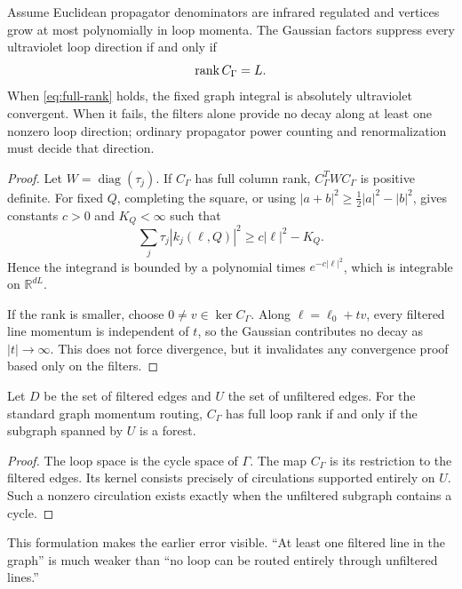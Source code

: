 \documentclass[11pt]{article}
\newcommand{\RR}{\mathbb{R}}
\begin{document}
\begin{theorem}
\label{thm:rank}
Assume Euclidean propagator denominators are infrared regulated and vertices
grow at most polynomially in loop momenta. The Gaussian factors suppress
every ultraviolet loop direction if and only if
\begin{equation}
 \operatorname{rank} C_\Gamma=L.
 \label{eq:full-rank}
\end{equation}
When \eqref{eq:full-rank} holds, the fixed graph integral is absolutely
ultraviolet convergent. When it fails, the filters alone provide no decay
along at least one nonzero loop direction; ordinary propagator power counting
and renormalization must decide that direction.
\end{theorem}

\begin{proof}
Let \(W=\operatorname{diag}(\tau_j)\). If \(C_\Gamma\) has full column rank,
\(C_\Gamma^{T}WC_\Gamma\) is positive definite. For fixed \(Q\), completing
the square, or using
\(|a+b|^2\geq\tfrac12|a|^2-|b|^2\), gives constants \(c>0\) and \(K_Q<\infty\)
such that
\[
 \sum_j\tau_j|k_j(\ell,Q)|^2
 \geq c|\ell|^2-K_Q.
\]
Hence the integrand is bounded by a polynomial times \(e^{-c|\ell|^2}\),
which is integrable on \(\RR^{dL}\).

If the rank is smaller, choose \(0\neq v\in\ker C_\Gamma\). Along
\(\ell=\ell_0+tv\), every filtered line momentum is independent of \(t\), so
the Gaussian contributes no decay as \(|t|\to\infty\). This does not force
divergence, but it invalidates any convergence proof based only on the
filters.
\end{proof}

\begin{corollary}
\label{cor:cycle}
Let \(D\) be the set of filtered edges and \(U\) the set of unfiltered edges.
For the standard graph momentum routing, \(C_\Gamma\) has full loop rank if
and only if the subgraph spanned by \(U\) is a forest.
\end{corollary}

\begin{proof}
The loop space is the cycle space of \(\Gamma\). The map \(C_\Gamma\) is its
restriction to the filtered edges. Its kernel consists precisely of
circulations supported entirely on \(U\). Such a nonzero circulation exists
exactly when the unfiltered subgraph contains a cycle.
\end{proof}

This formulation makes the earlier error visible. ``At least one filtered
line in the graph'' is much weaker than ``no loop can be routed entirely
through unfiltered lines.''
\end{document}
